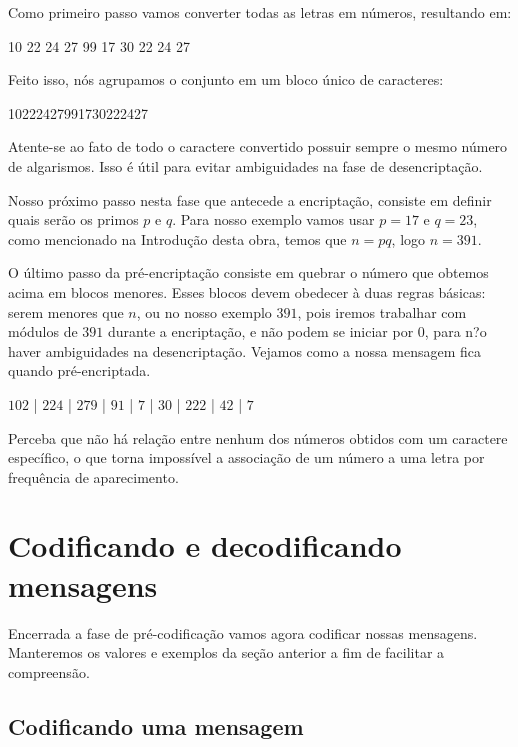 Como primeiro passo vamos converter todas as letras em n\'umeros, resultando em:
 
\begin{center}
10 22 24 27 99 17 30 22 24 27
\end{center}

Feito isso, n\'os agrupamos o conjunto em um bloco \'unico de caracteres:

\begin{center}
10222427991730222427
\end{center}

Atente-se ao fato de todo o caractere convertido possuir sempre o mesmo n\'umero de algarismos. Isso \'e \'util para evitar ambiguidades na fase de desencripta\c{c}\~ao.

Nosso pr\'oximo passo nesta fase que antecede a encripta\c{c}\~ao, consiste em definir quais ser\~ao os primos $p$ e $q$. Para nosso exemplo vamos usar $p=17$ e $q=23$, como mencionado na Introdu\c{c}\~ao desta obra, temos que $n = pq$, logo $n=391$.

O \'ultimo passo da pr\'e-encripta\c{c}\~ao consiste em quebrar o n\'umero que obtemos acima em blocos menores. Esses blocos devem obedecer \`a duas regras b\'asicas: serem menores que $n$, ou no nosso exemplo $391$, pois iremos trabalhar com m\'odulos de $391$ durante a encripta\c{c}\~ao, e n\~ao podem se iniciar por $0$, para n?o haver ambiguidades na desencripta\c{c}\~ao. Vejamos como a nossa mensagem fica quando pr\'e-encriptada.

\begin{center}
$102$ | $224$ | $279$ | $91$ | $7$ | $30$ | $222$ | $42$ | $7$
\end{center}

Perceba que n\~ao h\'a rela\c{c}\~ao entre nenhum dos n\'umeros obtidos com um caractere espec\'ifico, o que torna imposs\'ivel a associa\c{c}\~ao de um n\'umero a uma letra por frequ\^encia de aparecimento. 

\section{Codificando e decodificando mensagens}

Encerrada a fase de pr\'e-codifica\c{c}\~ao vamos agora codificar nossas mensagens. Manteremos os valores e exemplos da se\c{c}\~ao anterior a fim de facilitar a compreens\~ao.

\subsection{Codificando uma mensagem}

